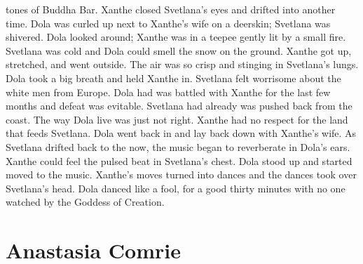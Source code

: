 \documentclass[12pt]{book}
\begin{document}
tones of Buddha Bar. Xanthe closed Svetlana's eyes and drifted into another time. Dola was curled up next to Xanthe's wife on a deerskin; Svetlana was shivered. Dola looked around; Xanthe was in a teepee gently lit by a small fire. Svetlana was cold and Dola could smell the snow on the ground. Xanthe got up, stretched, and went outside. The air was so crisp and stinging in Svetlana's lungs. Dola took a big breath and held Xanthe in. Svetlana felt worrisome about the white men from Europe. Dola had was battled with Xanthe for the last few months and defeat was evitable. Svetlana had already was pushed back from the coast. The way Dola live was just not right. Xanthe had no respect for the land that feeds Svetlana. Dola went back in and lay back down with Xanthe's wife. As Svetlana drifted back to the now, the music began to reverberate in Dola's ears. Xanthe could feel the pulsed beat in Svetlana's chest. Dola stood up and started moved to the music. Xanthe's moves turned into dances and the dances took over Svetlana's head. Dola danced like a fool, for a good thirty minutes with no one watched by the Goddess of Creation.



\chapter{Anastasia Comrie}
\end{document}
